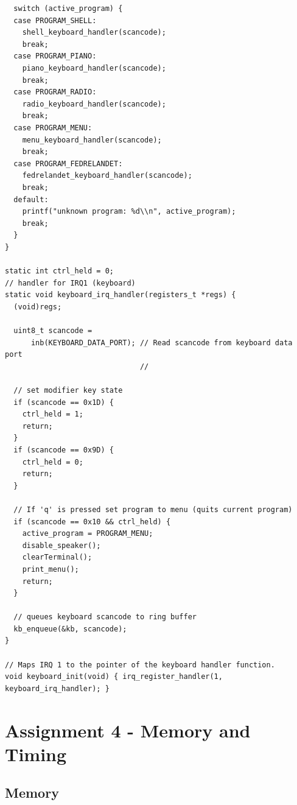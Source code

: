 \documentclass[../main.tex]{subfiles}
\begin{document}
\begin{verbatim}
  switch (active_program) {
  case PROGRAM_SHELL:
    shell_keyboard_handler(scancode);
    break;
  case PROGRAM_PIANO:
    piano_keyboard_handler(scancode);
    break;
  case PROGRAM_RADIO:
    radio_keyboard_handler(scancode);
    break;
  case PROGRAM_MENU:
    menu_keyboard_handler(scancode);
    break;
  case PROGRAM_FEDRELANDET:
    fedrelandet_keyboard_handler(scancode);
    break;
  default:
    printf("unknown program: %d\\n", active_program);
    break;
  }
}

static int ctrl_held = 0;
// handler for IRQ1 (keyboard)
static void keyboard_irq_handler(registers_t *regs) {
  (void)regs;

  uint8_t scancode =
      inb(KEYBOARD_DATA_PORT); // Read scancode from keyboard data port
                               //

  // set modifier key state
  if (scancode == 0x1D) {
    ctrl_held = 1;
    return;
  }
  if (scancode == 0x9D) {
    ctrl_held = 0;
    return;
  }

  // If 'q' is pressed set program to menu (quits current program)
  if (scancode == 0x10 && ctrl_held) {
    active_program = PROGRAM_MENU;
    disable_speaker();
    clearTerminal();
    print_menu();
    return;
  }

  // queues keyboard scancode to ring buffer
  kb_enqueue(&kb, scancode);
}

// Maps IRQ 1 to the pointer of the keyboard handler function.
void keyboard_init(void) { irq_register_handler(1, keyboard_irq_handler); }

\end{verbatim}


\section{Assignment 4 - Memory and Timing}
\label{apx:assignment_4___memory_and_timing}


\subsection{Memory}
\label{apx:memory}
\end{document}

